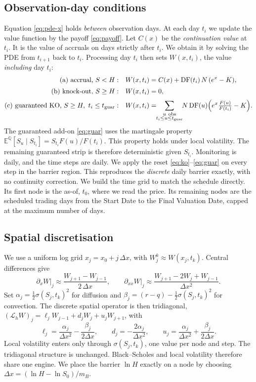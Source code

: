 \documentclass[11pt]{article}
\newcommand{\E}{\mathbb{E}}
\newcommand{\QQ}{\mathbb{Q}}
\newcommand{\DF}{\mathrm{DF}}
\newcommand{\Lh}{\mathcal{L}_h}
\begin{document}
\subsection{Observation-day conditions}
Equation \eqref{eq:pde-x} holds \emph{between} observation days. At each day $t_i$ we update the
value function by the payoff \eqref{eq:payoff}. Let $C(x)$ be the \emph{continuation value} at
$t_i$. It is the value of accruals on days strictly after $t_i$. We obtain it by solving the PDE
from $t_{i+1}$ back to $t_i$. Processing day $t_i$ then sets $W(x,t_i)$, the value \emph{including}
day $t_i$:
\begin{align}
\text{(a) accrual, } S<H:\quad&
  W(x,t_i) = C(x) + \DF(t_i)\,N\,(e^{x}-K), \label{eq:accrue}\\[2pt]
\text{(b) knock-out, } S\ge H:\quad&
  W(x,t_i) = 0, \label{eq:ko}\\[2pt]
\text{(c) guaranteed KO, } S\ge H,\ t_i\le t_{\mathrm{guar}}:\quad&
  W(x,t_i) = \!\!\sum_{\substack{u\ \mathrm{obs}\\ t_i\le u\le t_{\mathrm{guar}}}}\!\!
  N\,\DF(u)\Bigl(e^{x}\tfrac{F(u)}{F(t_i)}-K\Bigr). \label{eq:guar}
\end{align}
The guaranteed add-on \eqref{eq:guar} uses the martingale property
$\E^{\QQ}[S_u\mid S_{t_i}]=S_{t_i}F(u)/F(t_i)$. This property holds under local volatility. The
remaining guaranteed strip is therefore deterministic given $S_{t_i}$. Monitoring is daily, and the
time steps are daily. We apply the reset \eqref{eq:ko}--\eqref{eq:guar} on every step in the barrier
region. This reproduces the \emph{discrete} daily barrier exactly, with no continuity correction.
We build the time grid to match the schedule directly. Its first node is the as-of, $t_0$, where we
read the price. Its remaining nodes are the scheduled trading days from the Start Date to the Final
Valuation Date, capped at the maximum number of days.

\subsection{Spatial discretisation}
We use a uniform log grid $x_j=x_0+j\,\Delta x$, with $W_j^k\approx W(x_j,t_k)$. Central
differences give
\begin{equation}
  \partial_x W\big|_j \approx \frac{W_{j+1}-W_{j-1}}{2\,\Delta x},\qquad
  \partial_{xx} W\big|_j \approx \frac{W_{j+1}-2W_j+W_{j-1}}{\Delta x^2}.
\end{equation}
Set $\alpha_j=\tfrac12\sigma(S_j,t_k)^2$ for diffusion and $\beta_j=(r-q)-\tfrac12\sigma(S_j,t_k)^2$
for convection. The discrete spatial operator is then tridiagonal,
$(\Lh W)_j=\ell_j W_{j-1}+d_j W_j+u_j W_{j+1}$, with
\begin{equation}
  \ell_j=\frac{\alpha_j}{\Delta x^2}-\frac{\beta_j}{2\Delta x},\qquad
  d_j=-\frac{2\alpha_j}{\Delta x^2},\qquad
  u_j=\frac{\alpha_j}{\Delta x^2}+\frac{\beta_j}{2\Delta x}.
  \label{eq:Lcoeffs}
\end{equation}
Local volatility enters only through $\sigma(S_j,t_k)$, one value per node and step. The
tridiagonal structure is unchanged. Black--Scholes and local volatility therefore share one engine.
We place the barrier $\ln H$ exactly on a node by choosing $\Delta x=(\ln H-\ln S_0)/m_B$.
\end{document}
